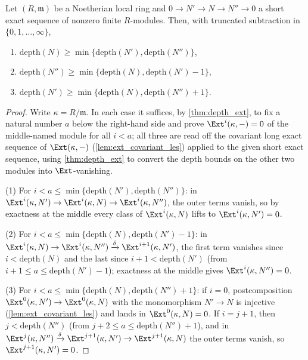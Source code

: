 \begin{theorem}
  \label{thm:depth_ses}
  \leanok
  Let \((R, \mathfrak m)\) be a Noetherian local ring and
  \(0 \to N' \to N \to N'' \to 0\) a short exact sequence of nonzero finite
  \(R\)-modules. Then, with truncated subtraction in \(\{0, 1, \dots, \infty\}\),
  \begin{enumerate}
    \item \(\mathrm{depth}(N) \geq \min\{\mathrm{depth}(N'), \mathrm{depth}(N'')\}\),
    \item \(\mathrm{depth}(N'') \geq \min\{\mathrm{depth}(N), \mathrm{depth}(N') - 1\}\),
    \item \(\mathrm{depth}(N') \geq \min\{\mathrm{depth}(N), \mathrm{depth}(N'') + 1\}\).
  \end{enumerate}
\end{theorem}
\begin{proof}
  \leanok
  Write \(\kappa = R/\mathfrak m\). In each case it suffices, by \ref{thm:depth_ext}, to
  fix a natural number \(a\) below the right-hand side and prove
  \(\Ext^i(\kappa, -) = 0\) of the middle-named module for all \(i < a\); all three are
  read off the covariant long exact sequence of \(\Ext(\kappa, -)\)
  (\ref{lem:ext_covariant_les}) applied to the given short exact sequence, using
  \ref{thm:depth_ext} to convert the depth bounds on the other two modules into
  \(\Ext\)-vanishing.

  (1) For \(i < a \leq \min\{\mathrm{depth}(N'), \mathrm{depth}(N'')\}\): in
  \(\Ext^i(\kappa, N') \to \Ext^i(\kappa, N) \to \Ext^i(\kappa, N'')\), the outer terms
  vanish, so by exactness at the middle every class of \(\Ext^i(\kappa, N)\) lifts to
  \(\Ext^i(\kappa, N') = 0\).

  (2) For \(i < a \leq \min\{\mathrm{depth}(N), \mathrm{depth}(N') - 1\}\): in
  \(\Ext^i(\kappa, N) \to \Ext^i(\kappa, N'') \xrightarrow{\delta}
  \Ext^{i+1}(\kappa, N')\), the first term vanishes since \(i < \mathrm{depth}(N)\) and
  the last since \(i + 1 < \mathrm{depth}(N')\) (from \(i + 1 \leq a \leq
  \mathrm{depth}(N') - 1\)); exactness at the middle gives
  \(\Ext^i(\kappa, N'') = 0\).

  (3) For \(i < a \leq \min\{\mathrm{depth}(N), \mathrm{depth}(N'') + 1\}\): if
  \(i = 0\), postcomposition \(\Ext^0(\kappa, N') \to \Ext^0(\kappa, N)\) with the
  monomorphism \(N' \to N\) is injective (\ref{lem:ext_covariant_les}) and lands in
  \(\Ext^0(\kappa, N) = 0\). If \(i = j + 1\), then \(j < \mathrm{depth}(N'')\) (from
  \(j + 2 \leq a \leq \mathrm{depth}(N'') + 1\)), and in
  \(\Ext^{j}(\kappa, N'') \xrightarrow{\delta} \Ext^{j+1}(\kappa, N') \to
  \Ext^{j+1}(\kappa, N)\) the outer terms vanish, so
  \(\Ext^{j+1}(\kappa, N') = 0\).
\end{proof}

